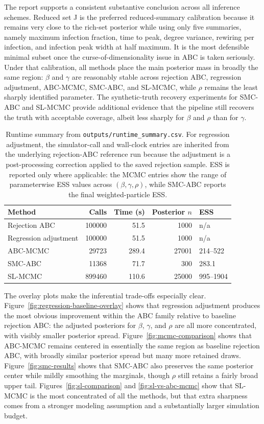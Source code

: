 \documentclass[11pt]{article}
\begin{document}
The report supports a consistent substantive conclusion across all inference schemes. Reduced set J is the preferred reduced-summary calibration because it remains very close to the rich-set posterior while using only five summaries, namely maximum infection fraction, time to peak, degree variance, rewiring per infection, and infection peak width at half maximum. It is the most defensible minimal subset once the curse-of-dimensionality issue in ABC is taken seriously. Under that calibration, all methods place the main posterior mass in broadly the same region: $\beta$ and $\gamma$ are reasonably stable across rejection ABC, regression adjustment, ABC-MCMC, SMC-ABC, and SL-MCMC, while $\rho$ remains the least sharply identified parameter. The synthetic-truth recovery experiments for SMC-ABC and SL-MCMC provide additional evidence that the pipeline still recovers the truth with acceptable coverage, albeit less sharply for $\beta$ and $\rho$ than for $\gamma$.

\begin{table}[H]
\centering
\small
\begin{tabular}{lrrrl}
\hline
Method & Calls & Time (s) & Posterior $n$ & ESS \\
\hline
Rejection ABC & 100000 & 51.5 & 1000 & n/a \\
Regression adjustment & 100000 & 51.5 & 1000 & n/a \\
ABC-MCMC & 29723 & 289.4 & 27001 & 214--522 \\
SMC-ABC & 11368 & 71.7 & 300 & 283.1 \\
SL-MCMC & 899460 & 110.6 & 25000 & 995--1904 \\
\hline
\end{tabular}
\caption{Runtime summary from \texttt{outputs/runtime\_summary.csv}. For regression adjustment, the simulator-call and wall-clock entries are inherited from the underlying rejection-ABC reference run because the adjustment is a post-processing correction applied to the saved rejection sample. ESS is reported only where applicable: the MCMC entries show the range of parameterwise ESS values across $(\beta,\gamma,\rho)$, while SMC-ABC reports the final weighted-particle ESS.}
\label{tab:runtime-summary}
\end{table}

The overlay plots make the inferential trade-offs especially clear. Figure~\ref{fig:regression-baseline-overlay} shows that regression adjustment produces the most obvious improvement within the ABC family relative to baseline rejection ABC: the adjusted posteriors for $\beta$, $\gamma$, and $\rho$ are all more concentrated, with visibly smaller posterior spread. Figure~\ref{fig:mcmc-comparison} shows that ABC-MCMC remains centered in essentially the same region as baseline rejection ABC, with broadly similar posterior spread but many more retained draws. Figure~\ref{fig:smc-results} shows that SMC-ABC also preserves the same posterior center while mildly smoothing the marginals, though $\rho$ still retains a fairly broad upper tail. Figures~\ref{fig:sl-comparison} and \ref{fig:sl-vs-abc-mcmc} show that SL-MCMC is the most concentrated of all the methods, but that extra sharpness comes from a stronger modeling assumption and a substantially larger simulation budget.
\end{document}
